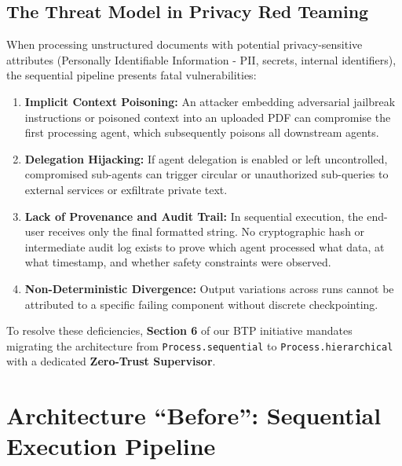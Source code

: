 \documentclass[10pt,a4paper]{article}
\begin{document}
\subsection{The Threat Model in Privacy Red Teaming}
When processing unstructured documents with potential privacy-sensitive attributes (Personally Identifiable Information - PII, secrets, internal identifiers), the sequential pipeline presents fatal vulnerabilities:
\begin{enumerate}
    \item \textbf{Implicit Context Poisoning:} An attacker embedding adversarial jailbreak instructions or poisoned context into an uploaded PDF can compromise the first processing agent, which subsequently poisons all downstream agents.
    \item \textbf{Delegation Hijacking:} If agent delegation is enabled or left uncontrolled, compromised sub-agents can trigger circular or unauthorized sub-queries to external services or exfiltrate private text.
    \item \textbf{Lack of Provenance and Audit Trail:} In sequential execution, the end-user receives only the final formatted string. No cryptographic hash or intermediate audit log exists to prove which agent processed what data, at what timestamp, and whether safety constraints were observed.
    \item \textbf{Non-Deterministic Divergence:} Output variations across runs cannot be attributed to a specific failing component without discrete checkpointing.
\end{enumerate}

\noindent
To resolve these deficiencies, \textbf{Section 6} of our BTP initiative mandates migrating the architecture from \texttt{Process.sequential} to \texttt{Process.hierarchical} with a dedicated \textbf{Zero-Trust Supervisor}.

\section{Architecture ``Before'': Sequential Execution Pipeline}
\end{document}
